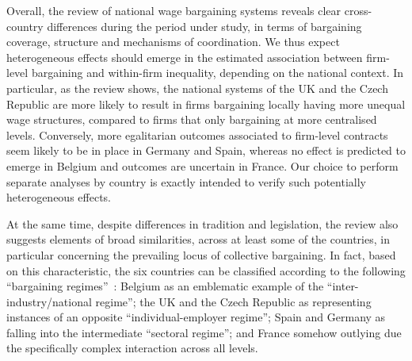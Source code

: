 \documentclass[12pt]{article}
\begin{document}
Overall, the review of national wage bargaining systems reveals clear cross-country differences during the period under study, in terms of bargaining coverage, structure and mechanisms of coordination. We thus expect heterogeneous effects should emerge in the estimated association between firm-level bargaining and within-firm inequality, depending on the national context. In particular, as the review shows, the national systems of the UK and the Czech Republic are more likely to result in firms bargaining locally having more unequal wage structures, compared to firms that only bargaining at more centralised levels. Conversely, more egalitarian outcomes associated to firm-level contracts seem likely to be in place in Germany and Spain, whereas no effect is predicted to emerge in Belgium and outcomes are uncertain in France. Our choice to perform separate analyses by country is exactly intended to verify such potentially heterogeneous effects.

At the same time, despite differences in tradition and legislation, the review also suggests elements of broad similarities, across at least some of the countries, in particular concerning the prevailing locus of collective bargaining. In fact, based on this characteristic, the six countries can be classified according to the following “bargaining regimes”~\citep[see][]{fulton.2013}: Belgium as an emblematic example of the “inter-industry/national regime”; the UK and the Czech Republic as representing instances of an opposite “individual-employer regime”; Spain and Germany as falling into the intermediate “sectoral regime”; and France somehow outlying due the specifically complex interaction across all levels.
\end{document}
